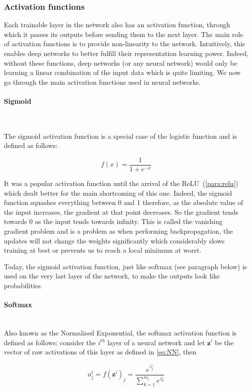 \documentclass[12pt,twoside]{article}
\newcommand{\para}[1]{\paragraph{#1}\mbox{}\\}
\begin{document}
\subsubsection{Activation functions}

Each trainable layer in the network also has an activation function, through
which it passes its outputs before sending them to the next layer.
The main role of activation functions is to provide non-linearity to the network.
Intuitively, this enables deep networks to better fulfill their representation
learning power. Indeed, without these functions, deep networks (or any neural
network) would only be learning a linear combination of the input data which is
quite limiting. We now go through the main activation functions used in neural
networks.

\para{Sigmoid}\label{para:sigmoid}

The sigmoid activation function is a special case of the logistic function and
is defined as follows:

\begin{equation}
  f(x) = \frac{1}{1 + e^{-x}}
  \label{eq:sigmoid}
\end{equation}

It was a popular activation function until the arrival of the
ReLU~(\ref{para:relu}) which dealt better for the main shortcoming of this one.
Indeed, the sigmoid function squashes everything between 0 and 1 therefore, as
the absolute value of the input increases, the gradient at that point
decreases. So the gradient tends towards 0 as the input tends towards infinity.
This is called the vanishing gradient problem and is a problem as when
performing backpropagation, the updates will not change the weights
significantly which considerably slows training at best or prevents us to reach
a local minimum at worst.

Today, the sigmoid activation function, just like softmax (see paragraph below)
is used on the very last layer of the network, to make the outputs look like
probabilities.

\para{Softmax}\label{para:softmax}
Also known as the Normalised Exponential, the softmax activation function is
defined as follows: consider the $i^{th}$ layer of a neural network and let
$\bm{z}^i$ be the vector of raw activations of this layer as defined in 
\eqref{eq:NN}, then 

\begin{equation}
  a_j^i = f(\bm{z}^i)_j = \frac{e^{z_j^i}}{\sum^{m_{i}}_{k=1} e^{z_k^i}}
  \label{eq:softmax}
\end{equation}
\end{document}
